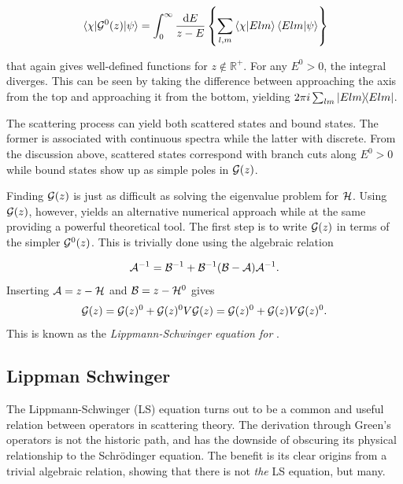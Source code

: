 \begin{equation*}
  \mel{\chi}{\oop{G}^{0}(z)}{\psi} = \int_{0}^{\infty}\frac{\dd E}{z-E}\left\{
  \sum_{l,m}\ip{\chi}{Elm}\ip{Elm}{\psi}
  \right\}
\end{equation*}

that again gives well-defined functions for \(z\notin\mathbb{R}^{+}\). For any
\(E^{0} > 0\), the integral diverges. This can be seen by taking the difference
between approaching the axis from the top and approaching it from the bottom,
yielding\cite[p.~469]{messiah} \(2\pi i \sum_{lm}\op{Elm}\).

The scattering process can yield both scattered states and bound states. The
former is associated with continuous spectra while the latter with discrete.
From the discussion above, scattered states correspond with branch cuts
along \(E^{0}>0\) while bound states show up as simple poles in \(\mathcal{G}(z)\).

Finding \(\mathcal{G}(z)\) is just as difficult as solving the eigenvalue problem
for \(\mathcal{H}\). Using \(\mathcal{G}(z)\), however, yields an alternative numerical
approach while at the same providing a powerful theoretical tool. The first step
is to write \(\mathcal{G}(z)\) in terms of the simpler \(\mathcal{G}^{0}(z)\). This is
trivially done using the algebraic relation

\begin{equation*}
  \mathcal{A}^{-1} = \mathcal{B}^{-1} + \mathcal{B}^{-1}(\mathcal{B}-\mathcal{A})\mathcal{A}^{-1}.
\end{equation*}
Inserting \(\mathcal{A} = z-\mathcal{H}\) and \(\mathcal{B} = z-\mathcal{H}^{0}\) gives
\begin{equation}
  \label{eq:LSG}
  \mathcal{G}(z) = \mathcal{G}(z){}^{0} + \mathcal{G}(z){}^{0}V\mathcal{G}(z){} = \mathcal{G}(z){}^{0} + \mathcal{G}(z){}V\mathcal{G}(z){}^{0}.
\end{equation}
This is known as the \textit{Lippmann-Schwinger equation for \mgop{}}.


\subsection{Lippman Schwinger}

The Lippmann-Schwinger (LS) equation turns out to be a common and useful relation
between operators in scattering theory. The derivation through Green's operators
is not the historic path, and has the downside of obscuring its physical
relationship to the Schr\"odinger equation. The benefit is its clear origins
from a trivial algebraic relation, showing that there is not \textit{the} LS
equation, but many.

